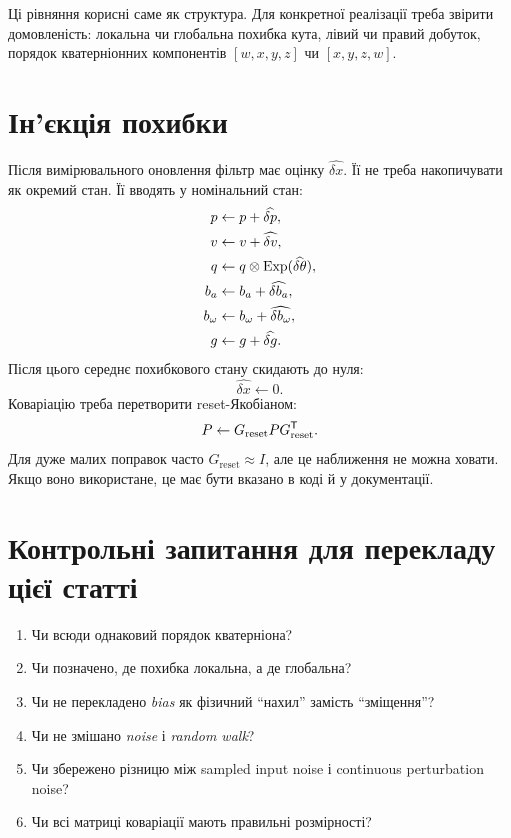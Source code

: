 Ці рівняння корисні саме як структура. Для конкретної реалізації треба звірити домовленість: локальна чи глобальна похибка кута, лівий чи правий добуток, порядок кватерніонних компонентів $[w,x,y,z]$ чи $[x,y,z,w]$.

\section{Ін'єкція похибки}

Після вимірювального оновлення фільтр має оцінку $\widehat{\delta x}$. Її не треба накопичувати як окремий стан. Її вводять у номінальний стан:
\begin{align}
p &\leftarrow p+\widehat{\delta p},\\
v &\leftarrow v+\widehat{\delta v},\\
q &\leftarrow q\otimes \operatorname{Exp}(\widehat{\delta\theta}),\\
b_a &\leftarrow b_a+\widehat{\delta b_a},\\
b_\omega &\leftarrow b_\omega+\widehat{\delta b_\omega},\\
g &\leftarrow g+\widehat{\delta g}.
\end{align}
Після цього середнє похибкового стану скидають до нуля:
\[
\widehat{\delta x}\leftarrow 0.
\]
Коваріацію треба перетворити reset-Якобіаном:
\[
P \leftarrow G_{\mathrm{reset}}P G_{\mathrm{reset}}^{\mathsf{T}}.
\]
Для дуже малих поправок часто $G_{\mathrm{reset}}\approx I$, але це наближення не можна ховати. Якщо воно використане, це має бути вказано в коді й у документації.

\section{Контрольні запитання для перекладу цієї статті}

\begin{enumerate}
\item Чи всюди однаковий порядок кватерніона?
\item Чи позначено, де похибка локальна, а де глобальна?
\item Чи не перекладено \emph{bias} як фізичний ``нахил'' замість ``зміщення''?
\item Чи не змішано \emph{noise} і \emph{random walk}?
\item Чи збережено різницю між sampled input noise і continuous perturbation noise?
\item Чи всі матриці коваріації мають правильні розмірності?
\end{enumerate}
